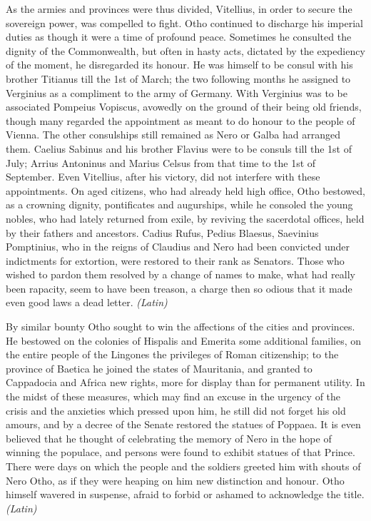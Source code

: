 As the armies and provinces were thus divided, Vitellius, in order to secure the sovereign power, was compelled to fight. Otho continued to discharge his imperial duties as though it were a time of profound peace. Sometimes he consulted the dignity of the Commonwealth, but often in hasty acts, dictated by the expediency of the moment, he disregarded its honour. He was himself to be consul with his brother Titianus till the 1st of March; the two following months he assigned to Verginius as a compliment to the army of Germany. With Verginius was to be associated Pompeius Vopiscus, avowedly on the ground of their being old friends, though many regarded the appointment as meant to do honour to the people of Vienna. The other consulships still remained as Nero or Galba had arranged them. Caelius Sabinus and his brother Flavius were to be consuls till the 1st of July; Arrius Antoninus and Marius Celsus from that time to the 1st of September. Even Vitellius, after his victory, did not interfere with these appointments. On aged citizens, who had already held high office, Otho bestowed, as a crowning dignity, pontificates and augurships, while he consoled the young nobles, who had lately returned from exile, by reviving the sacerdotal offices, held by their fathers and ancestors. Cadius Rufus, Pedius Blaesus, Saevinius Pomptinius, who in the reigns of Claudius and Nero had been convicted under indictments for extortion, were restored to their rank as Senators. Those who wished to pardon them resolved by a change of names to make, what had really been rapacity, seem to have been treason, a charge then so odious that it made even good laws a dead letter. \emph{(Latin)}


By similar bounty Otho sought to win the affections of the cities and provinces. He bestowed on the colonies of Hispalis and Emerita some additional families, on the entire people of the Lingones the privileges of Roman citizenship; to the province of Baetica he joined the states of Mauritania, and granted to Cappadocia and Africa new rights, more for display than for permanent utility. In the midst of these measures, which may find an excuse in the urgency of the crisis and the anxieties which pressed upon him, he still did not forget his old amours, and by a decree of the Senate restored the statues of Poppaea. It is even believed that he thought of celebrating the memory of Nero in the hope of winning the populace, and persons were found to exhibit statues of that Prince. There were days on which the people and the soldiers greeted him with shouts of Nero Otho, as if they were heaping on him new distinction and honour. Otho himself wavered in suspense, afraid to forbid or ashamed to acknowledge the title. \emph{(Latin)}

